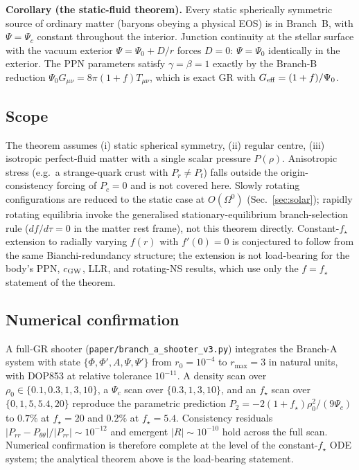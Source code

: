 \documentclass[aps,prd,twocolumn,nofootinbib,floatfix,superscriptaddress]{revtex4-2}
\begin{document}
\textbf{Corollary (the static-fluid theorem).} Every static
spherically symmetric source of ordinary matter (baryons obeying
a physical EOS) is in Branch~B, with $\Psi=\Psi_c$ constant
throughout the interior. Junction continuity at the stellar
surface with the vacuum exterior $\Psi=\Psi_0+D/r$ forces $D=0$:
$\Psi=\Psi_0$ identically in the exterior. The PPN parameters
satisfy $\gamma=\beta=1$ exactly by the Branch-B reduction
$\Psi_0 G_{\mu\nu}=8\pi(1+f)T_{\mu\nu}$, which is exact GR with
$G_{\rm eff}=(1+f)/\Psi_0$.

\subsection{Scope}

The theorem assumes (i) static spherical symmetry, (ii) regular
centre, (iii) isotropic perfect-fluid matter with a single scalar
pressure $P(\rho)$. Anisotropic stress (e.g.\ a strange-quark
crust with $P_r\neq P_t$) falls outside the origin-consistency
forcing of $P_c=0$ and is not covered here. Slowly rotating
configurations are reduced to the static case at $O(\Omega^0)$
(Sec.~\ref{sec:solar}); rapidly rotating equilibria invoke the
generalised stationary-equilibrium branch-selection rule
($df/d\tau=0$ in the matter rest frame), not this theorem
directly. Constant-$f_\star$ extension to radially varying $f(r)$
with $f'(0)=0$ is conjectured to follow from the same
Bianchi-redundancy structure; the extension is not load-bearing
for the body's PPN, $c_{\rm GW}$, LLR, and rotating-NS results,
which use only the $f=f_\star$ statement of the theorem.

\subsection{Numerical confirmation}

A full-GR shooter (\texttt{paper/branch\_a\_shooter\_v3.py})
integrates the Branch-A system with state
$\{\Phi,\Phi',A,\Psi,\Psi'\}$ from $r_0=10^{-4}$ to $r_{\max}=3$
in natural units, with DOP853 at relative tolerance $10^{-11}$.
A density scan over $\rho_0\in\{0.1,0.3,1,3,10\}$, a $\Psi_c$
scan over $\{0.3,1,3,10\}$, and an $f_\star$ scan over
$\{0,1,5,5.4,20\}$ reproduce the parametric prediction
$P_2=-2(1+f_\star)\rho_0^2/(9\Psi_c)$ to $0.7\%$ at $f_\star=20$
and $0.2\%$ at $f_\star=5.4$. Consistency residuals
$|P_{rr}-P_{\theta\theta}|/|P_{rr}|\sim 10^{-12}$ and emergent
$|R|\sim 10^{-10}$ hold across the full scan. Numerical confirmation
is therefore complete at the level of the constant-$f_\star$ ODE
system; the analytical theorem above is the load-bearing statement.
\end{document}
